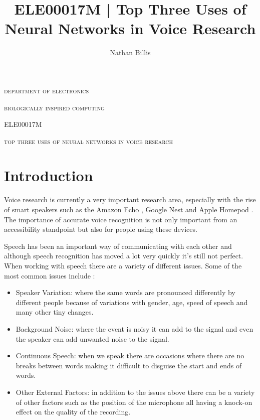 \documentclass[11pt]{article}
\title{ 
    ELE00017M | Top Three Uses of Neural Networks in Voice Research
}
\author{Nathan Billis}
\begin{document}
\begin{titlepage}
    \centering
    {\scshape\LARGE department of electronics \par}
    \vspace{0.5cm}
    {\scshape\Large biologically inspired computing \par}
    \vspace{0.5cm}
    {\scshape\Large ELE00017M \par}
    \vspace{2.5cm}
    {\scshape\Large top three uses of neural networks in voice research \par}
    \vfill
    {\Large\itshape \@author \par}
    \vspace{2cm}
    
    \tableofcontents

\end{titlepage}

	
\newpage

    \section{Introduction}
    
    Voice research is currently a very important research area, especially with the rise of smart speakers such as the Amazon Echo \cite{IntroducingRoom}, Google Nest \cite{GoogleStore} and Apple Homepod \cite{HomePodUK}. The importance of accurate voice recognition is not only important from an accessibility standpoint but also for people using these devices. 
    
    Speech has been an important way of communicating with each other and although speech recognition has moved a lot very quickly it's still not perfect. When working with speech there are a variety of different issues. Some of the most common issues include \cite{Gevaert2010NeuralRecognition}: 
    \begin{itemize}
        \item Speaker Variation: where the same words are pronounced differently by different people because of variations with gender, age, speed of speech and many other tiny changes.
        \item Background Noise: where the event is noisy it can add to the signal and even the speaker can add unwanted noise to the signal.
        \item Continuous Speech: when we speak there are occasions where there are no breaks between words making it difficult to disguise the start and ends of words.
        \item Other External Factors: in addition to the issues above there can be a variety of other factors such as the position of the microphone all having a knock-on effect on the quality of the recording.
    \end{itemize}
    
\end{document}
